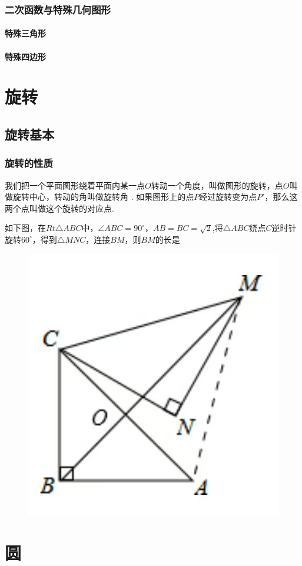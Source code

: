 \documentclass[lang=cn, 10pt, titlestyle=display, oneside, toc=twocol]{elegantbook}
\begin{document}
\subsection{二次函数与\textbf{特殊几何图形}}

\subsubsection*{特殊三角形}

\subsubsection*{特殊四边形}
\chapter{旋转}

\section{旋转基本}

\subsection{旋转的性质}

我们把一个平面图形绕着平面内某一点\(O \)转动一个角度，叫做图形的旋转，点\(O \)叫做旋转中心，转动的角叫做旋转角 . 如果图形上的点\(P \)经过旋转变为点\(P' \)，那么这两个点叫做这个旋转的对应点.

\begin{example}
    如下图，在\(Rt\triangle ABC \)中，\(\angle ABC = 90^\circ \)，\(AB=BC=\sqrt{2}\),将\(\triangle ABC\)绕点\(C\)逆时针旋转\(60^\circ\)，得到\(\triangle MNC\)，连接\(BM\)，则\(BM\)的长是 \underline{\hspace{3em}}
    
\begin{figure}[h]
    \raggedright
    \includegraphics[width=0.25\linewidth]{figure/example_rotation1.jpg}
    
    \label{fig:enter-label}
\end{figure}
    
\end{example}



\chapter{圆}
\end{document}
